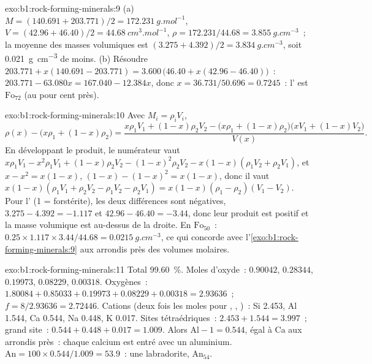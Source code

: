 \begin{solution}{exo:b1:rock-forming-minerals:9}
(a) $M = (140.691 + 203.771)/2 = \qty{172.231}{g.mol^{-1}}$, $V = (42.96 +
46.40)/2 = \qty{44.68}{cm^3.mol^{-1}}$, $\rho = 172.231/44.68 =
\qty{3.855}{g.cm^{-3}}$~; la moyenne des masses volumiques est $(3.275 + 4.392)/2 =
\qty{3.834}{g.cm^{-3}}$, soit \qty{0.021}{g.cm^{-3}} de moins. (b) Résoudre
$203.771 + x(140.691 - 203.771) = 3.600\,\bigl(46.40 + x(42.96 - 46.40)\bigr)$~:
$203.771 - 63.080x = 167.040 - 12.384x$, donc $x = 36.731/50.696 = 0.7245$~:
l' est $\text{Fo}_{72}$ (au pour cent près).
\end{solution}

\begin{solution}{exo:b1:rock-forming-minerals:10}
Avec $M_i = \rho_i V_i$,
\[
  \rho(x) - \bigl(x\rho_1 + (1 - x)\rho_2\bigr)
  = \frac{x\rho_1V_1 + (1 - x)\rho_2V_2 - \bigl(x\rho_1 + (1 - x)\rho_2\bigr)\bigl(xV_1 + (1 - x)V_2\bigr)}{V(x)} .
\]
En développant le produit, le numérateur vaut $x\rho_1V_1 - x^2\rho_1V_1 +
(1 - x)\rho_2V_2 - (1 - x)^2\rho_2V_2 - x(1 - x)(\rho_1V_2 + \rho_2V_1)$, et
$x - x^2 = x(1 - x)$, $(1 - x) - (1 - x)^2 = x(1 - x)$, donc il vaut
$x(1 - x)(\rho_1V_1 + \rho_2V_2 - \rho_1V_2 - \rho_2V_1) =
x(1 - x)(\rho_1 - \rho_2)(V_1 - V_2)$. Pour l' (1 = forstérite), les deux
différences sont négatives, $3.275 - 4.392 = -1.117$ et $42.96 - 46.40 =
-3.44$, donc leur produit est positif et la masse volumique est au-dessus de la
droite. En $\text{Fo}_{50}$~: $0.25\times1.117\times3.44/44.68 =
\qty{0.0215}{g.cm^{-3}}$, ce qui concorde avec l'\cref{exo:b1:rock-forming-minerals:9}
aux arrondis près des volumes molaires.
\end{solution}

\begin{solution}{exo:b1:rock-forming-minerals:11}
Total \qty{99.60}{\percent}. Moles d'oxyde~:  $0.90042$,
 $0.28344$,  $0.19973$,  $0.08229$,
 $0.00318$. Oxygènes~: $1.80084 + 0.85033 + 0.19973 + 0.08229 +
0.00318 = 2.93636$~; $f = 8/2.93636 = 2.72446$. Cations (deux fois les moles pour
, , )~: Si \num{2.453}, Al \num{1.544}, Ca
\num{0.544}, Na \num{0.448}, K \num{0.017}. Sites tétraédriques~:
$2.453 + 1.544 = 3.997$~; grand site~: $0.544 + 0.448 + 0.017 = 1.009$. Alors
$\mathrm{Al} - 1 = 0.544$, égal à Ca aux arrondis près~: chaque calcium est entré
avec un aluminium. $\mathrm{An} = 100\times0.544/1.009 = 53.9$~: une
labradorite, $\text{An}_{54}$.
\end{solution}

